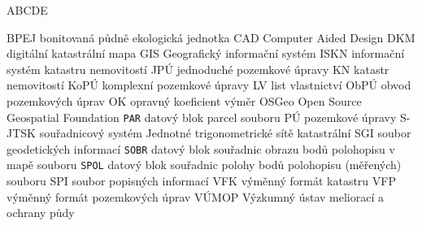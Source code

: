 
\begin{seznamzkratek}{ABCDE}

	      {BPEJ}
	      {bonitovaná půdně ekologická jednotka}
	      {CAD}
	      {Computer Aided Design}
	      {DKM}
	      {digitální katastrální mapa}
	      {GIS}
	      {Geografický informační systém}
	      {ISKN}
	      {informační systém katastru nemovitostí}
	      {JPÚ}
	      {jednoduché pozemkové úpravy}
	      {KN}
	      {katastr nemovitostí}
	      {KoPÚ}
	      {komplexní pozemkové úpravy}
	      {LV}
	      {list vlastnictví}
	      {ObPÚ}
	      {obvod pozemkových úprav}
	      {OK}
	      {opravný koeficient výměr}
	      {OSGeo}
	      {Open Source Geospatial Foundation}
	      {\texttt{PAR}}
	      {datový blok parcel souboru }
	      {PÚ}
	      {pozemkové úpravy}
	      {S-JTSK}
	      {souřadnicový systém Jednotné trigonometrické sítě katastrální}
	      {SGI}
	      {soubor geodetických informací}
	      {\texttt{SOBR}}
	      {datový blok souřadnic obrazu bodů polohopisu v mapě souboru }
	      {\texttt{SPOL}}
	      {datový blok souřadnic polohy bodů polohopisu (měřených) souboru }
	      {SPI}
	      {soubor popisných informací}
	      {VFK}
	      {výměnný formát katastru}
	      {VFP}
	      {výměnný formát pozemkových úprav}
	      {VÚMOP}
	      {Výzkumný ústav meliorací a ochrany půdy}
	      
\end{seznamzkratek}